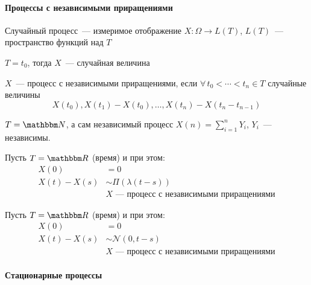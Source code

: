 \documentclass[12pt, timbord]{../../../notes}
\begin{document}
\paragraph{Процессы с независимыми приращениями}
\label{par:proc::indep}

\begin{defn}\label{defn:proc::indep}
  Случайный процесс~--- измеримое отображение $X \colon \Omega \to L(T)$, $L(T)$~--- пространство функций над $T$
\end{defn}
\begin{exmp}\label{exmp:proc::indep::point}
  $T = {t_0}$, тогда $X$~--- случайная величина
\end{exmp}

\begin{defn}\label{defn:proc::indep::ind}
  $X$~--- процесс с независимыми приращениями, если $\forall\, t_0 < \cdots < t_n \in T$ случайные величины 
  \[
    X(t_0), X(t_1) - X(t_0), \dotsc, X(t_n) - X(t_n - t_{n-1})
  \]
\end{defn}

\begin{exmp}\label{exmp:proc::indep::N}
  $T = \N$, а сам независимый процесс $X(n) = \sum_{i=1}^n Y_i$, $Y_i$~--- независимы.
\end{exmp}

\begin{defn}\label{defn:proc::indep::pois}
  Пусть $T = \R$ (время) и при этом:
  \begin{align*}
    X(0) &= 0 \\
    X(t) - X(s) &\sim \Pi(\lambda(t-s)) \\
                &X \text{~--- процесс с независимыми приращениями}
  \end{align*}
\end{defn}
\begin{defn}\label{defn:proc::indep::viner}
  Пусть $T = \R$ (время) и при этом:
  \begin{align*}
    X(0) &= 0 \\
    X(t) - X(s) &\sim \mathcal N (0, t-s) \\
                &X \text{~--- процесс с независимыми приращениями}
  \end{align*}
\end{defn}

\paragraph{Стационарные процессы}
\label{par:proc::const}
\end{document}
